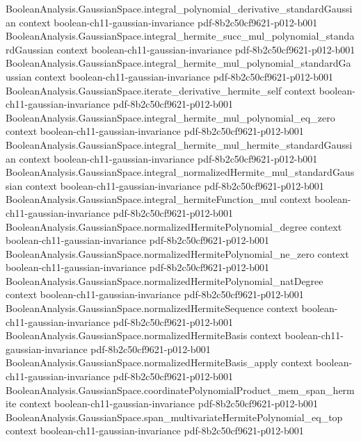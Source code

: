 \begin{lemma}
\proofstep
  {BooleanAnalysis.GaussianSpace.integral_polynomial_derivative_standardGaussian}
  {context}
  {boolean-ch11-gaussian-invariance}
  {pdf-8b2c50cf9621-p012-b001}
\proofstep
  {BooleanAnalysis.GaussianSpace.integral_hermite_succ_mul_polynomial_standardGaussian}
  {context}
  {boolean-ch11-gaussian-invariance}
  {pdf-8b2c50cf9621-p012-b001}
\proofstep
  {BooleanAnalysis.GaussianSpace.integral_hermite_mul_polynomial_standardGaussian}
  {context}
  {boolean-ch11-gaussian-invariance}
  {pdf-8b2c50cf9621-p012-b001}
\proofstep
  {BooleanAnalysis.GaussianSpace.iterate_derivative_hermite_self}
  {context}
  {boolean-ch11-gaussian-invariance}
  {pdf-8b2c50cf9621-p012-b001}
\proofstep
  {BooleanAnalysis.GaussianSpace.integral_hermite_mul_polynomial_eq_zero}
  {context}
  {boolean-ch11-gaussian-invariance}
  {pdf-8b2c50cf9621-p012-b001}
\proofstep
  {BooleanAnalysis.GaussianSpace.integral_hermite_mul_hermite_standardGaussian}
  {context}
  {boolean-ch11-gaussian-invariance}
  {pdf-8b2c50cf9621-p012-b001}
\proofstep
  {BooleanAnalysis.GaussianSpace.integral_normalizedHermite_mul_standardGaussian}
  {context}
  {boolean-ch11-gaussian-invariance}
  {pdf-8b2c50cf9621-p012-b001}
\proofstep
  {BooleanAnalysis.GaussianSpace.integral_hermiteFunction_mul}
  {context}
  {boolean-ch11-gaussian-invariance}
  {pdf-8b2c50cf9621-p012-b001}
\proofstep
  {BooleanAnalysis.GaussianSpace.normalizedHermitePolynomial_degree}
  {context}
  {boolean-ch11-gaussian-invariance}
  {pdf-8b2c50cf9621-p012-b001}
\proofstep
  {BooleanAnalysis.GaussianSpace.normalizedHermitePolynomial_ne_zero}
  {context}
  {boolean-ch11-gaussian-invariance}
  {pdf-8b2c50cf9621-p012-b001}
\proofstep
  {BooleanAnalysis.GaussianSpace.normalizedHermitePolynomial_natDegree}
  {context}
  {boolean-ch11-gaussian-invariance}
  {pdf-8b2c50cf9621-p012-b001}
\proofstep
  {BooleanAnalysis.GaussianSpace.normalizedHermiteSequence}
  {context}
  {boolean-ch11-gaussian-invariance}
  {pdf-8b2c50cf9621-p012-b001}
\proofstep
  {BooleanAnalysis.GaussianSpace.normalizedHermiteBasis}
  {context}
  {boolean-ch11-gaussian-invariance}
  {pdf-8b2c50cf9621-p012-b001}
\proofstep
  {BooleanAnalysis.GaussianSpace.normalizedHermiteBasis_apply}
  {context}
  {boolean-ch11-gaussian-invariance}
  {pdf-8b2c50cf9621-p012-b001}
\proofstep
  {BooleanAnalysis.GaussianSpace.coordinatePolynomialProduct_mem_span_hermite}
  {context}
  {boolean-ch11-gaussian-invariance}
  {pdf-8b2c50cf9621-p012-b001}
\proofstep
  {BooleanAnalysis.GaussianSpace.span_multivariateHermitePolynomial_eq_top}
  {context}
  {boolean-ch11-gaussian-invariance}
  {pdf-8b2c50cf9621-p012-b001}

\end{lemma}
